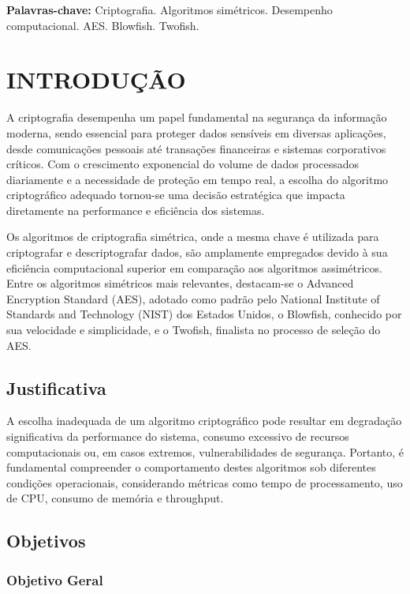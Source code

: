 \documentclass[12pt,a4paper,oneside]{article}
\begin{document}
\vspace{0.5cm}
\noindent\textbf{Palavras-chave:} Criptografia. Algoritmos simétricos. Desempenho computacional. AES. Blowfish. Twofish.

\newpage
\tableofcontents

\newpage
\section{INTRODUÇÃO}

A criptografia desempenha um papel fundamental na segurança da informação moderna, sendo essencial para proteger dados sensíveis em diversas aplicações, desde comunicações pessoais até transações financeiras e sistemas corporativos críticos. Com o crescimento exponencial do volume de dados processados diariamente e a necessidade de proteção em tempo real, a escolha do algoritmo criptográfico adequado tornou-se uma decisão estratégica que impacta diretamente na performance e eficiência dos sistemas.

Os algoritmos de criptografia simétrica, onde a mesma chave é utilizada para criptografar e descriptografar dados, são amplamente empregados devido à sua eficiência computacional superior em comparação aos algoritmos assimétricos. Entre os algoritmos simétricos mais relevantes, destacam-se o Advanced Encryption Standard (AES), adotado como padrão pelo National Institute of Standards and Technology (NIST) dos Estados Unidos, o Blowfish, conhecido por sua velocidade e simplicidade, e o Twofish, finalista no processo de seleção do AES.

\subsection{Justificativa}

A escolha inadequada de um algoritmo criptográfico pode resultar em degradação significativa da performance do sistema, consumo excessivo de recursos computacionais ou, em casos extremos, vulnerabilidades de segurança. Portanto, é fundamental compreender o comportamento destes algoritmos sob diferentes condições operacionais, considerando métricas como tempo de processamento, uso de CPU, consumo de memória e throughput.

\subsection{Objetivos}

\subsubsection{Objetivo Geral}
\end{document}

